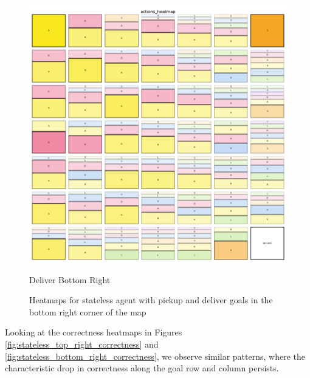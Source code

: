 \begin{figure}[h!]
\begin{minipage}[b]{0.45\textwidth}
    \includegraphics[width=\textwidth]{
      images/results_discussion/stateless/not_central/stateless_deliver_bottom_right.png
    }
    \caption{Deliver Bottom Right}
    \label{fig:stateless_deliver_bottom_right}
  \end{minipage}
  \caption{Heatmaps for stateless agent with pickup and deliver goals in the
  bottom right corner of the map}
  \label{fig:stateless_bottom_right}
\end{figure}
\vspace{5mm}

Looking at the correctness heatmaps in Figures
\ref{fig:stateless_top_right_correctness} and
\ref{fig:stateless_bottom_right_correctness}, we observe similar patterns, where
the characteristic drop in correctness along the goal row and column persists.

